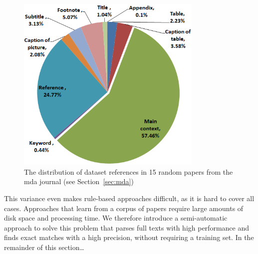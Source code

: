 \documentclass{IOS-Book-Article}
\begin{document}
\begin{figure}[h]
	\centering
	\includegraphics[width=3.5in]{DistPlaces3.PNG} 
	\caption{The distribution of dataset references in 15 random papers from the mda journal (see Section~\ref{sec:mda})}
	\label{fig:places-example}
\end{figure}

This variance even makes rule-based approaches difficult, as it is hard to cover all cases. 
Approaches that learn from a corpus of papers require large amounts of disk space and processing time.
We therefore introduce a semi-automatic approach to solve this problem that parses full texts with high performance and finds exact matches with a high precision, without requiring a training set. 
In the remainder of this section\dots {} 
\end{document}
